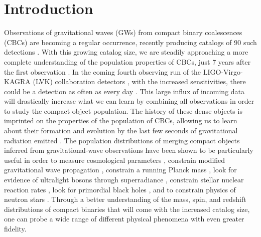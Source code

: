 \section{Introduction} \label{sec:intro}

Observations of gravitational waves (GWs) from compact binary coalescences (CBCs) are becoming a regular occurrence, 
recently producing catalogs of 90 such detections \citep{GWTC1,gwtc2,GWTC3}. With this growing catalog size, we are steadily approaching a more complete  
understanding of the population properties of CBCs, just 7 years after the first observation \citep{o1o2_pop,o3a_pop,o3b_astro_dist}. 
In the coming fourth observing run of the LIGO-Virgo-KAGRA (LVK) collaboration detectors \citep{aLIGO,aVIRGO}, with the increased sensitivities, 
there could be a detection as often as every day \citep{LVK_prospects}. This large influx of incoming data will drastically increase what we can 
learn by combining all observations in order to study the compact object population. The history of these dense objects is imprinted on the properties 
of the population  of CBCs, allowing us to learn about their formation and evolution by the last few seconds of gravitational radiation emitted \citep{Zevin_2017}. 
The population distributions of merging compact objects inferred from gravitational-wave observations have been shown to be particularly useful in order to
measure cosmological parameters \citep{Farr_2019HUB,gwtc3_cosmo}, constrain modified gravitational wave propagation \citep{ModGWProp,ModGWProp2}, 
constrain a running Planck mass \citep{Lagos_runningPlanckMass}, look for evidence of ultralight bosons through superradiance \citep{Ng_Boson2021,GWTC2_superradiance_Ng}, 
constrain stellar nuclear reaction rates \citep{Farmer_2019,Farmer_2020}, look for primordial black holes \citep{Ng_2021,KenNgPBH2022}, 
and to constrain physics of neutron stars \citep{Golomb_EOS,LandryRead_NS_Masses2021}. Through a better understanding of the mass, spin, and redshift distributions of 
compact binaries that will come with the increased catalog size, one can probe a wide range of different physical phenomena with even greater fidelity.


